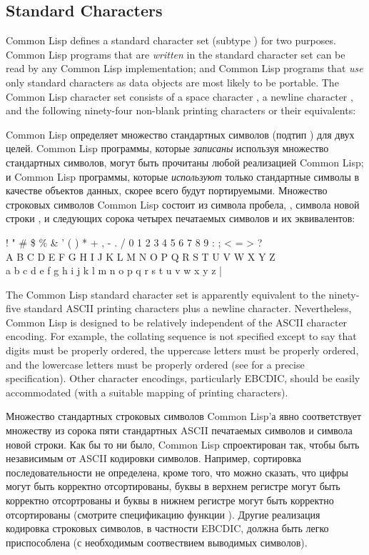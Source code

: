 \subsection{Standard Characters}

Common Lisp defines a standard character set (subtype )
for two purposes.
Common Lisp programs that are {\it written} in the standard character set
can be read by any Common Lisp implementation; and Common Lisp programs
that {\it use} only standard characters as data objects are most likely
to be portable.  The Common Lisp character set consists of a space character
, a newline character , and the
following ninety-four
non-blank printing characters or their equivalents:

Common Lisp определяет множество стандартных символов (подтип
) для двух целей.
Common Lisp программы, которые {\it записаны} используя множество стандартных
символов, могут быть прочитаны любой реализацией Common Lisp; и Common Lisp
программы, которые {\it используют} только стандартные символы в качестве
объектов данных, скорее всего будут портируемыми. Множество строковых символов
Common Lisp состоит из символа пробела, , символа
новой строки , и следующих сорока четырех печатаемых
символов и их эквивалентов:
\begin{lisp}
! " \# \$ \% \& ' ( ) * + , - . / 0 1 2 3 4 5 6 7 8 9 : ; < = > ? \\
{\Xatsign} A B C D E F G H I J K L M N O P Q R S T U V W X Y Z {\Xlbracket} {\Xbackslash} {\Xrbracket} {\Xcircumflex} {\Xunderscore} \\
{\Xbq} a b c d e f g h i j k l m n o p q r s t u v w x y z {\Xlbrace} | {\Xrbrace} {\Xtilde}
\end{lisp}
The Common Lisp standard character set is apparently equivalent to
the ninety-five standard ASCII printing characters plus a newline character.
Nevertheless, Common Lisp is designed to be relatively independent of
the ASCII character encoding.  For example, the collating sequence
is not specified except to say that digits must be properly ordered,
the uppercase letters must be properly ordered, and
the lowercase letters must be properly ordered
(see  for a precise specification).
Other character encodings, particularly EBCDIC, should be easily accommodated
(with a suitable mapping of printing characters).

Множество стандартных строковых символов Common Lisp'а явно соответствует
множеству из сорока пяти стандартных ASCII печатаемых символов и символа новой
строки. Как бы то ни было, Common Lisp спроектирован так, чтобы быть независимым
от ASCII кодировки символов. Например, сортировка последовательности не
определена, кроме того, что можно сказать, что цифры могут быть корректно
отсортированы, буквы в верхнем регистре могут быть корректно отсортрованы и
буквы в нижнем регистре могут быть корректно отсортированы (смотрите
спецификацию функции ). Другие реализация кодировка строковых
символов, в частности EBCDIC, должна быть легко приспособлена (с необходимым
соотвествием выводимых символов).

